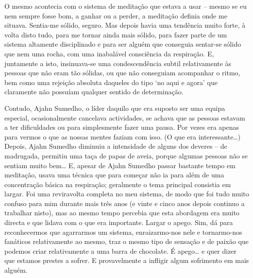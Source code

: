 O mesmo acontecia com o sistema de meditação que estava a usar -- mesmo se eu nem sempre fosse bom, a ganhar ou a perder, a meditação definia onde me situava. Sentia-me sólido, seguro. Mas depois havia uma tendência muito forte, à volta disto tudo, para me tornar ainda mais sólido, para fazer parte de um sistema altamente disciplinado e para ser alguém que conseguia sentar-se sólido que nem uma rocha, com uma inabalável consciência da respiração. E, juntamente a isto, insinuava-se uma condescendência subtil relativamente às pessoas que não eram tão sólidas, ou que não conseguiam acompanhar o ritmo, bem como uma rejeição absoluta daqueles do tipo `no aqui e agora' que claramente não possuíam qualquer sentido de determinação.

Contudo, Ajahn Sumedho, o líder daquilo que era suposto ser uma equipa especial, ocasionalmente cancelava actividades, se achava que as pessoas estavam a ter dificuldades ou para simplesmente fazer uma pausa. Por vezes era apenas para vermos o que as nossas mentes faziam com isso. (O que era interessante\ldots{}) Depois, Ajahn Sumedho diminuiu a intensidade de alguns dos deveres -- de madrugada, permitiu uma taça de papas de aveia, porque algumas pessoas não se sentiam muito bem\ldots{} E, apesar de Ajahn Sumedho passar bastante tempo em meditação, usava uma técnica que para começar não ia para além de uma concentração básica na respiração; geralmente o tema principal consistia em largar. Foi uma reviravolta completa no meu sistema, de modo que foi tudo muito confuso para mim durante mais três anos (e vinte e cinco anos depois continuo a trabalhar nisto), mas ao mesmo tempo percebia que esta abordagem era muito directa e que lidava com o que era importante. Largar o apego. Sim, dá para reconhecermos que agarrarmos um sistema, enraizarmo-nos nele e tornarmo-nos fanáticos relativamente ao mesmo, traz o mesmo tipo de sensação e de paixão que podemos criar relativamente a uma barra de chocolate. É apego\ldots{} e quer dizer que estamos prestes a sofrer. E provavelmente a infligir algum sofrimento em mais alguém.

